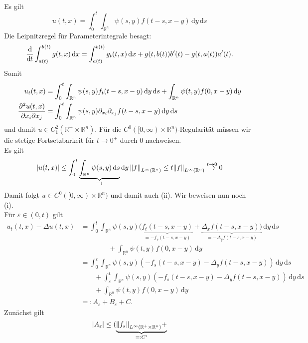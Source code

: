 \begin{beweis}
	Es gilt
	\[
		u(t,x)= \int_{0}^{t} \int_{\mathbb{R}^n}^{} \psi(s,y)f(t-s,x-y) \,\mathrm{d}y \,\mathrm{d}s
	\]
	Die Leipnitzregel für Parameterintegrale besagt:
	\[
		\frac{\mathrm{d}\mkern-1.0mu }{\mathrm{d}\mkern-1.0mu t}  \int_{a(t)}^{b(t)} g(t,x) \,\mathrm{d}x = \int_{a(t)}^{b(t)} g_t(t,x) \,\mathrm{d}x + g(t,b(t))b'(t) - g(t,a(t))a'(t).
	\]
	Somit
	\begin{align*}
		u_t(t,x) &= \int_{0}^{t} \int_{\mathbb{R}^n}^{} \psi(s,y)f_t(t-s,x-y) \,\mathrm{d}y \,\mathrm{d}s +
		\int_{\mathbb{R}^n}^{}\psi(t,y)f(0,x-y) \,\mathrm{d}y \\
		\frac{{\partial ^2u(t,x)}}{{\partial x_i \partial x_j}}  &= \int_{0}^{t} \int_{\mathbb{R}^n}^{} \psi(s,y) \partial_{x_i} \partial_{x_j} f(t-s,x-y) \,\mathrm{d}y \,\mathrm{d}s
	\end{align*}
	und damit $u \in C^2_1(\mathbb{R}^{+} \times \mathbb{R}^n)$. 
	Für die $C^0([0,\infty)\times \mathbb{R}^n)$-Regularität müssen wir die stetige Fortsetzbarkeit für $t \to 0^+$ durch $0$ nachweisen. \\
	Es gilt
	\[
		\abs{u(t,x)} \leq  \int_{0}^{t} \underset{=1}{\underbrace{\int_{\mathbb{R}^n}^{} \psi(s,y) \,\mathrm{d}s}} \,\mathrm{d}y \, \norm{f}_{L^{\infty}(\mathbb{R}^n)} 
		\leq t \norm{f}_{L^{\infty}(\mathbb{R}^n)} \stackrel{t \to 0}{\to} 0
	\]
	Damit folgt $u \in C^0([0,\infty) \times \mathbb{R}^n)$ und damit auch (ii). Wir beweisen nun noch (i). \\
	Für $\varepsilon \in (0,t)$ gilt
	\begin{align*}
		u_t(t,x)- \Delta u(t,x) &= \int_{0}^{t} \int_{\mathbb{R}^n}^{} \psi(s,y)(\underset{=-f_s(t-s,x-y)}{\underbrace{f_t(t-s,x-y)}} 
		+ \underset{=-\Delta_y f(t-s,x-y)}{\underbrace{ \Delta_x f(t-s,x-y))}} \,\mathrm{d}y \,\mathrm{d}s \\
		& \qquad \qquad + \int_{\mathbb{R}^n}^{} \psi(t,y) f(0,x-y) \,\mathrm{d}y \\
		&= \int_{0}^{\varepsilon} \int_{\mathbb{R}^n}^{} \psi(s,y) (-f_s(t-s,x-y) - \Delta_y f(t-s,x-y)) \,\mathrm{d}y \,\mathrm{d}s \\
		& \qquad + \int_{\varepsilon}^{t} \int_{\mathbb{R}^n}^{} \psi(s,y) (-f_s(t-s,x-y) - \Delta_y f(t-s,x-y)) \,\mathrm{d}y \,\mathrm{d}s \\
		& \qquad + \int_{\mathbb{R}^n}^{} \psi(t,y)f(0,x-y) \,\mathrm{d}y \\
		&=: A_{\varepsilon}+ B _{\varepsilon} + C.
	\end{align*}
	Zunächst gilt 
	\[
		\abs{A _{\varepsilon}} \leq ( \underset{=:C'}{\underbrace{\norm{f_s}_{L^{\infty}(\mathbb{R}^{+} \times \mathbb{R}^n)} +
}}\]
\end{beweis}
